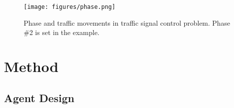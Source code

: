 \begin{figure}
    \centering
    \texttt{[image: figures/phase.png]}
    \caption{Phase and traffic movements in traffic signal control problem. Phase \#2 is set in the example.}
    \label{fig:preliminary}
    \vspace{-2mm}
\end{figure}

\vspace{-2mm}
\section{Method}

\subsection{Agent Design}
\label{sec:formulation}

